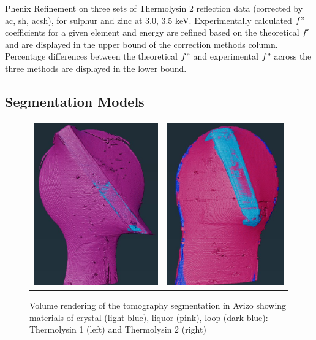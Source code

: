 \begin{table}[H]
\caption{Phenix Refinement on three sets of Thermolysin 2 reflection data (corrected by \ac{ac}, \ac{sh}, \ac{acsh}), for sulphur and zinc at 3.0, 3.5 \unit{keV}. Experimentally calculated $f"$ coefficients for a given element and energy are refined based on the theoretical $f'$ and are displayed in the upper bound of the correction methods column. Percentage differences between the theoretical $f"$ and experimental $f"$ across the three methods are displayed in the lower bound.}
\label{phenix_table}
\end{table}


\newpage

\subsection*{Segmentation Models}

\renewcommand{\thefigure}{A\arabic{figure}}
\setcounter{figure}{0}

\begin{figure}[h]
    \begin{tabular}{cc}
    	\includegraphics[height=7cm ]{images/avizo_flats/tlys9.jpg} & \includegraphics[height=7cm]{images/avizo_flats/tlys2.jpg}
    \end{tabular}
	\caption{Volume rendering of the tomography segmentation in Avizo showing materials of crystal (light blue), liquor (pink), loop (dark blue): Thermolysin 1 (left) and Thermolysin 2 (right)}
 \label{tlys2}
\end{figure}


